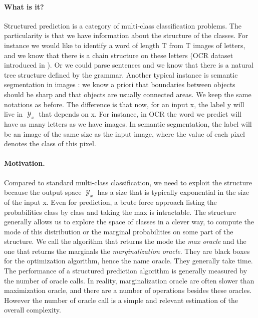 \documentclass{article}
\DeclareMathOperator{\1}{\mathbb{1}}
\DeclareMathOperator{\Y}{\mathcal{Y}}
\begin{document}
\paragraph{What is it?}
Structured prediction is a category of multi-class classification problems.
The particularity is that we have information about the structure of the classes.
For instance we would like to identify a word of length T from T images of letters, and we know that there is a chain structure on these letters (OCR dataset introduced in \cite{taskar_max-margin_2004}).
Or we could parse sentences and we know that there is a natural tree structure defined by the grammar.
Another typical instance is semantic segmentation in images : we know a priori that boundaries between objects should be sharp and that objects are usually connected areas.
We keep the same notations as before.
The difference is that now, for an input x, the label y will live in $\Y_x$ that depends on x.
For instance, in OCR the word we predict will have as many letters as we have images.
In semantic segmentation, the label will be an image of the same size as the input image, where the value of each pixel denotes the class of this pixel. 

\paragraph{Motivation.}
Compared to standard multi-class classification, we need to exploit the structure because the output space $\Y_x$ has a size that is typically exponential in the size of the input x.
Even for prediction, a brute force approach listing the probabilities class by class and taking the max is intractable.
The structure generally allows us to explore the space of classes in a clever way, to compute the mode of this distribution or the marginal probabilities on some part of the structure.
We call the algorithm that returns the mode the \textit{max oracle} and the one that returns the marginals the \textit{marginalization oracle}.
They are black boxes for the optimization algorithm, hence the name oracle.
They generally take time.
The performance of a structured prediction algorithm is generally measured by the number of oracle calls.
In reality, marginalization oracle are often slower than maximization oracle, and there are a number of operations besides these oracles.
However the number of oracle call is a simple and relevant estimation of the overall complexity.
\end{document}
